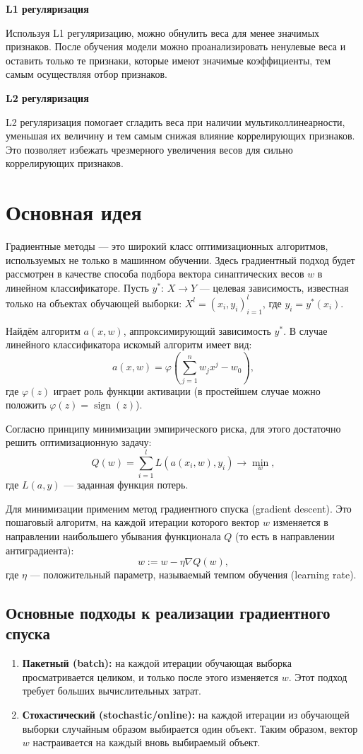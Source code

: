 \textbf{L1 регуляризация}

\noindent Используя L1 регуляризацию, можно обнулить веса для менее значимых признаков. После обучения модели можно проанализировать ненулевые веса и оставить только те признаки, которые имеют значимые коэффициенты, тем самым осуществляя отбор признаков.

\textbf{L2 регуляризация}

\noindent L2 регуляризация помогает сгладить веса при наличии мультиколлинеарности, уменьшая их величину и тем самым снижая влияние коррелирующих признаков. Это позволяет избежать чрезмерного увеличения весов для сильно коррелирующих признаков.

\section*{Основная идея}

Градиентные методы --- это широкий класс оптимизационных алгоритмов, используемых не только в машинном обучении. Здесь градиентный подход будет рассмотрен в качестве способа подбора вектора синаптических весов \( w \) в линейном классификаторе. Пусть \( y^*: \, X \to Y \) — целевая зависимость, известная только на объектах обучающей выборки: \( X^l = (x_i, y_i)_{i=1}^l \), где \( y_i = y^*(x_i) \).

Найдём алгоритм \( a(x, w) \), аппроксимирующий зависимость \( y^* \). В случае линейного классификатора искомый алгоритм имеет вид:
$$ a(x, w) = \varphi\left(\sum_{j=1}^n w_j x^j - w_0\right), $$
где \( \varphi(z) \) играет роль функции активации (в простейшем случае можно положить \( \varphi(z) = \operatorname{sign}(z) \)).

Согласно принципу минимизации эмпирического риска, для этого достаточно решить оптимизационную задачу:
$$ Q(w) = \sum_{i=1}^l L(a(x_i, w), y_i) \to \min_w, $$
где \( L(a, y) \) — заданная функция потерь.

Для минимизации применим метод градиентного спуска (gradient descent). Это пошаговый алгоритм, на каждой итерации которого вектор \( w \) изменяется в направлении наибольшего убывания функционала \( Q \) (то есть в направлении антиградиента):
$$ w := w - \eta \nabla Q(w), $$
где \( \eta \) — положительный параметр, называемый темпом обучения (learning rate).

\subsection*{Основные подходы к реализации градиентного спуска}
\begin{enumerate}
    \item \textbf{Пакетный (batch):} на каждой итерации обучающая выборка просматривается целиком, и только после этого изменяется \( w \). Этот подход требует больших вычислительных затрат.
    \item \textbf{Стохастический (stochastic/online):} на каждой итерации из обучающей выборки случайным образом выбирается один объект. Таким образом, вектор \( w \) настраивается на каждый вновь выбираемый объект.
\end{enumerate}

